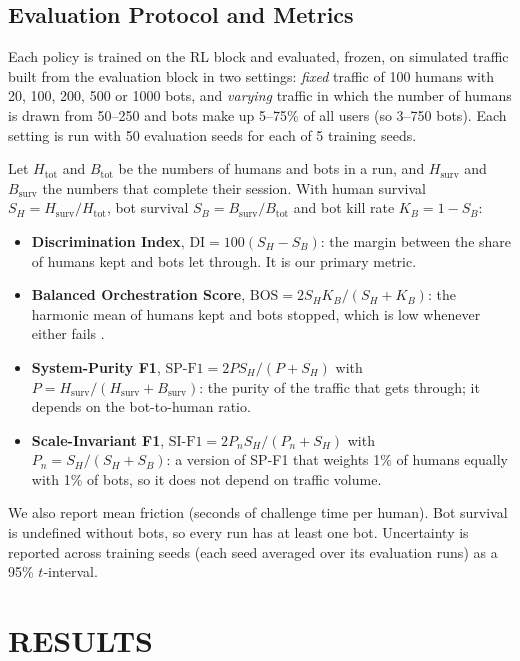 \documentclass{ieeetj}
\begin{document}
\vspace{-5pt}
\subsection{Evaluation Protocol and Metrics}
\label{sec:metrics}
Each policy is trained on the RL block and evaluated, frozen, on simulated traffic built from the evaluation block in two settings: \emph{fixed} traffic of 100 humans with 20, 100, 200, 500 or 1000 bots, and \emph{varying} traffic in which the number of humans is drawn from 50--250 and bots make up 5--75\% of all users (so 3--750 bots). Each setting is run with 50 evaluation seeds for each of 5 training seeds.

Let $H_{\text{tot}}$ and $B_{\text{tot}}$ be the numbers of humans and bots in a run, and $H_{\text{surv}}$ and $B_{\text{surv}}$ the numbers that complete their session. With human survival $S_H=H_{\text{surv}}/H_{\text{tot}}$, bot survival $S_B=B_{\text{surv}}/B_{\text{tot}}$ and bot kill rate $K_B=1-S_B$:
\begin{itemize}[leftmargin=*, itemsep=1pt]
\item \textbf{Discrimination Index}, $\text{DI}=100(S_H-S_B)$: the margin between the share of humans kept and bots let through. It is our primary metric.
\item \textbf{Balanced Orchestration Score}, $\text{BOS}=2S_HK_B/(S_H+K_B)$: the harmonic mean of humans kept and bots stopped, which is low whenever either fails \cite{fscore_2023}.
\item \textbf{System-Purity F1}, $\text{SP-F1}=2PS_H/(P+S_H)$ with $P=H_{\text{surv}}/(H_{\text{surv}}+B_{\text{surv}})$: the purity of the traffic that gets through; it depends on the bot-to-human ratio.
\item \textbf{Scale-Invariant F1}, $\text{SI-F1}=2P_nS_H/(P_n+S_H)$ with $P_n=S_H/(S_H+S_B)$: a version of SP-F1 that weights 1\% of humans equally with 1\% of bots, so it does not depend on traffic volume.
\end{itemize}
We also report mean friction (seconds of challenge time per human). 
Bot survival is undefined without bots, so every run has at least one bot.
Uncertainty is reported across training seeds (each seed averaged over its evaluation runs) as a 95\% $t$-interval.

\section{RESULTS}
\label{sec:results}
\end{document}
